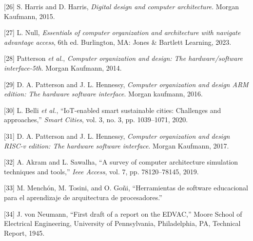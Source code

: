 \documentclass[12pt,oneside]{templates/unerthesis}
\newcommand{\CSLLeftMargin}[1]{#1} %
\newcommand{\CSLRightInline}[1]{#1} %
\newlength{\cslhangindent}
\newenvironment{CSLReferences}[2] %
 {\setlength{\parindent}{0pt}%
  \setlength{\leftskip}{#1 pt\relax}%
  \setlength{\parskip}{#2 pt\relax}%
  \everypar{\setlength{\hangindent}{\cslhangindent}}}
 {\par}
\begin{document}
\begin{CSLReferences}{0}{0}
\leavevmode{}%
\CSLLeftMargin{{[}26{]} }%
\CSLRightInline{S. Harris and D. Harris, \emph{Digital design and computer architecture}. Morgan Kaufmann, 2015.}

\leavevmode{}%
\CSLLeftMargin{{[}27{]} }%
\CSLRightInline{L. Null, \emph{Essentials of computer organization and architecture with navigate advantage access}, 6th ed. Burlington, MA: Jones \& Bartlett Learning, 2023.}

\leavevmode{}%
\CSLLeftMargin{{[}28{]} }%
\CSLRightInline{Patterson \emph{et al.}, \emph{Computer organization and design: The hardware/software interface-5th}. Morgan Kaufmann, 2014.}

\leavevmode{}%
\CSLLeftMargin{{[}29{]} }%
\CSLRightInline{D. A. Patterson and J. L. Hennessy, \emph{Computer organization and design ARM edition: The hardware software interface}. Morgan kaufmann, 2016.}

\leavevmode{}%
\CSLLeftMargin{{[}30{]} }%
\CSLRightInline{L. Belli \emph{et al.}, {``IoT-enabled smart sustainable cities: Challenges and approaches,''} \emph{Smart Cities}, vol. 3, no. 3, pp. 1039--1071, 2020.}

\leavevmode{}%
\CSLLeftMargin{{[}31{]} }%
\CSLRightInline{D. A. Patterson and J. L. Hennessy, \emph{Computer organization and design RISC-v edition: The hardware software interface}. Morgan Kaufmann, 2017.}

\leavevmode{}%
\CSLLeftMargin{{[}32{]} }%
\CSLRightInline{A. Akram and L. Sawalha, {``A survey of computer architecture simulation techniques and tools,''} \emph{Ieee Access}, vol. 7, pp. 78120--78145, 2019.}

\leavevmode{}%
\CSLLeftMargin{{[}33{]} }%
\CSLRightInline{M. Menchón, M. Tosini, and O. Goñi, {``Herramientas de software educacional para el aprendizaje de arquitectura de procesadores.''}}

\leavevmode{}%
\CSLLeftMargin{{[}34{]} }%
\CSLRightInline{J. von Neumann, {``First draft of a report on the {EDVAC},''} Moore School of Electrical Engineering, University of Pennsylvania, Philadelphia, PA, Technical Report, 1945.}


\end{CSLReferences}
\end{document}
